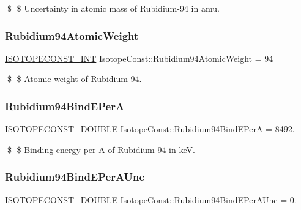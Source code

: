 \$ \$ Uncertainty in atomic mass of Rubidium-\/94 in amu. \mbox{\label{group___isotope_const-_rubidium-_rb94_gae9941cd08dd8e3ce7c5286e389e491c8}} 
\subsubsection{\texorpdfstring{Rubidium94\+Atomic\+Weight}{Rubidium94AtomicWeight}}
{\footnotesize\ttfamily \mbox{\hyperlink{group___isotope_const-_macros_ga5f18360b3e99483a35c32d789e62621c}{I\+S\+O\+T\+O\+P\+E\+C\+O\+N\+S\+T\+\_\+\+I\+NT}} Isotope\+Const\+::\+Rubidium94\+Atomic\+Weight = 94}

\$ \$ Atomic weight of Rubidium-\/94. \mbox{\label{group___isotope_const-_rubidium-_rb94_gadcef52391749154ac63da4eb3e40d8c8}} 
\subsubsection{\texorpdfstring{Rubidium94\+Bind\+E\+PerA}{Rubidium94BindEPerA}}
{\footnotesize\ttfamily \mbox{\hyperlink{group___isotope_const-_macros_ga8f45a7272ce02c0b4c65c44636ed719a}{I\+S\+O\+T\+O\+P\+E\+C\+O\+N\+S\+T\+\_\+\+D\+O\+U\+B\+LE}} Isotope\+Const\+::\+Rubidium94\+Bind\+E\+PerA = 8492.}

\$ \$ Binding energy per A of Rubidium-\/94 in keV. \mbox{\label{group___isotope_const-_rubidium-_rb94_ga0ec5764df4c47758e4ccf72156bbcd2f}} 
\subsubsection{\texorpdfstring{Rubidium94\+Bind\+E\+Per\+A\+Unc}{Rubidium94BindEPerAUnc}}
{\footnotesize\ttfamily \mbox{\hyperlink{group___isotope_const-_macros_ga8f45a7272ce02c0b4c65c44636ed719a}{I\+S\+O\+T\+O\+P\+E\+C\+O\+N\+S\+T\+\_\+\+D\+O\+U\+B\+LE}} Isotope\+Const\+::\+Rubidium94\+Bind\+E\+Per\+A\+Unc = 0.}

